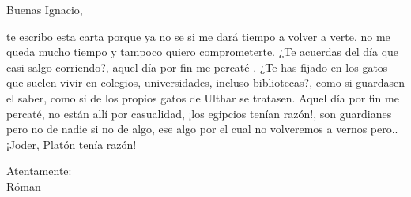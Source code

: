\documentclass{letter}
\date{12 de octubre 1967}
\begin{document}
 

\setlength{\parindent}{2em}

\begin{letter}{Buenas Ignacio,}
  \opening{
    te escribo esta carta porque ya no se si me dará tiempo a volver
    a verte, no me queda mucho tiempo y tampoco quiero comprometerte.
    ¿Te acuerdas del día que casi salgo corriendo?, aquel día por fin
    me percaté . ¿Te has fijado en los gatos que suelen vivir en colegios,
    universidades, incluso bibliotecas?, como si guardasen el saber, como
    si de los propios gatos de Ulthar se tratasen. Aquel día por fin me percaté,
    no están allí por casualidad, ¡los egipcios tenían razón!, son guardianes
    pero no de nadie si no de algo, ese algo por el cual no volveremos a
    vernos pero..  ¡Joder, Platón tenía razón! 
  }

  \closing{Atentamente:\\ Róman}
\end{letter}
\end{document}
